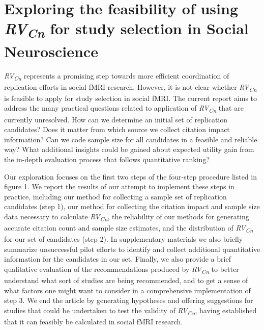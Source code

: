 \documentclass[
  english,
  man,floatsintext]{apa6}
\begin{document}
\hypertarget{exploring-the-feasibility-of-using-rvcn-for-study-selection-in-social-neuroscience}{%
\section{\texorpdfstring{Exploring the feasibility of using \emph{RV\textsubscript{Cn}} for study selection in Social Neuroscience}{Exploring the feasibility of using RVCn for study selection in Social Neuroscience}}\label{exploring-the-feasibility-of-using-rvcn-for-study-selection-in-social-neuroscience}}

\emph{RV\textsubscript{Cn}} represents a promising step towards more efficient coordination of replication efforts in social fMRI research. However, it is not clear whether \emph{RV\textsubscript{Cn}} is feasible to apply for study selection in social fMRI. The current report aims to address the many practical questions related to application of \emph{RV\textsubscript{Cn}} that are currently unresolved. How can we determine an initial set of replication candidates? Does it matter from which source we collect citation impact information? Can we code sample size for all candidates in a feasible and reliable way? What additional insights could be gained about expected utility gain from the in-depth evaluation process that follows quantitative ranking?

Our exploration focuses on the first two steps of the four-step procedure listed in figure 1. We report the results of our attempt to implement these steps in practice, including our method for collecting a sample set of replication candidates (step 1), our method for collecting the citation impact and sample size data necessary to calculate \emph{RV\textsubscript{Cn}}, the reliability of our methods for generating accurate citation count and sample size estimates, and the distribution of \emph{RV\textsubscript{Cn}} for our set of candidates (step 2). In supplementary materials we also briefly summarize unsuccessful pilot efforts to identify and collect additional quantitative information for the candidates in our set. Finally, we also provide a brief qualitative evaluation of the recommendations produced by \emph{RV\textsubscript{Cn}} to better understand what sort of studies are being recommended, and to get a sense of what factors one might want to consider in a comprehensive implementation of step 3. We end the article by generating hypotheses and offering suggestions for studies that could be undertaken to test the validity of \emph{RV\textsubscript{Cn}}, having established that it can feasibly be calculated in social fMRI research.
\end{document}
